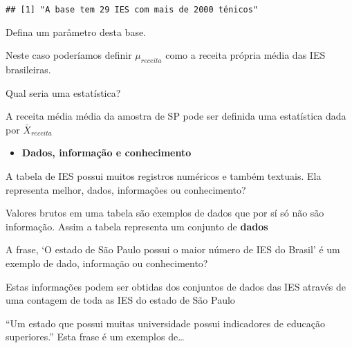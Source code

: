 \documentclass[12pt,]{style/krantz}
\providecommand{\tightlist}{%
  \setlength{\itemsep}{0pt}\setlength{\parskip}{0pt}}
\theoremstyle{definition}
\theoremstyle{definition}
\theoremstyle{definition}
\theoremstyle{remark}
\let\BeginKnitrBlock\begin \let\EndKnitrBlock\end
\begin{document}
\begin{verbatim}
## [1] "A base tem 29 IES com mais de 2000 ténicos"
\end{verbatim}

\BeginKnitrBlock{exercise}
\protect\hypertarget{exr:unnamed-chunk-12}{}{\label{exr:unnamed-chunk-12} }Defina um parâmetro desta base.
\EndKnitrBlock{exercise}

\BeginKnitrBlock{solution}
\iffalse{} {Solução. } \fi{}Neste caso poderíamos definir \(\mu_{receita}\) como a receita própria média das IES brasileiras.
\EndKnitrBlock{solution}

\BeginKnitrBlock{exercise}
\protect\hypertarget{exr:unnamed-chunk-14}{}{\label{exr:unnamed-chunk-14} }Qual seria uma estatística?
\EndKnitrBlock{exercise}

\BeginKnitrBlock{solution}
\iffalse{} {Solução. } \fi{}A receita média média da amostra de SP pode ser definida uma estatística dada por \(\bar X_{receita}\)
\EndKnitrBlock{solution}

\begin{itemize}
\tightlist
\item
  \textbf{Dados, informação e conhecimento}
\end{itemize}

\BeginKnitrBlock{exercise}
\protect\hypertarget{exr:unnamed-chunk-16}{}{\label{exr:unnamed-chunk-16} }A tabela de IES possui muitos registros numéricos e também textuais. Ela representa melhor, dados, informações ou conhecimento?
\EndKnitrBlock{exercise}

\BeginKnitrBlock{solution}
\iffalse{} {Solução. } \fi{}Valores brutos em uma tabela são exemplos de dados que por sí só não são informação. Assim a tabela representa um conjunto de \textbf{dados}
\EndKnitrBlock{solution}

\BeginKnitrBlock{exercise}
\protect\hypertarget{exr:unnamed-chunk-18}{}{\label{exr:unnamed-chunk-18} }A frase, `O estado de São Paulo possui o maior número de IES do Brasil' é um exemplo de dado, informação ou conhecimento?
\EndKnitrBlock{exercise}

\BeginKnitrBlock{solution}
\iffalse{} {Solução. } \fi{}Estas informações podem ser obtidas dos conjuntos de dados das IES através de uma contagem de toda as IES do estado de São Paulo
\EndKnitrBlock{solution}

\BeginKnitrBlock{exercise}
\protect\hypertarget{exr:unnamed-chunk-20}{}{\label{exr:unnamed-chunk-20} }``Um estado que possui muitas universidade possui indicadores de educação superiores.'' Esta frase é um exemplos de\ldots{}
\EndKnitrBlock{exercise}
\end{document}
